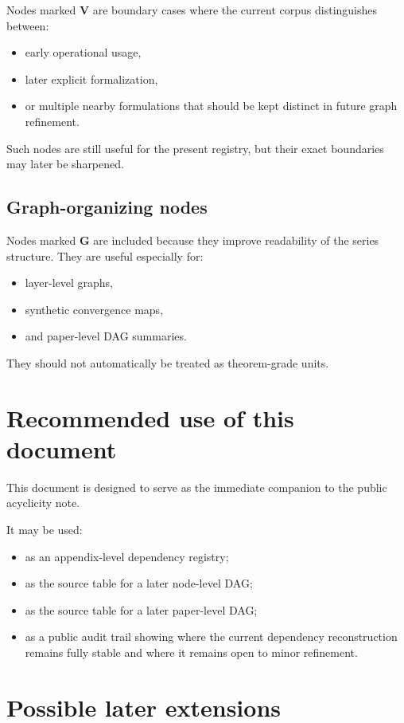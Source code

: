 \documentclass[11pt,a4paper]{article}
\begin{document}
	Nodes marked \textbf{V} are boundary cases where the current corpus distinguishes between:
	\begin{itemize}[leftmargin=2em]
		\item early operational usage,
		\item later explicit formalization,
		\item or multiple nearby formulations that should be kept distinct in future graph refinement.
	\end{itemize}
	
	Such nodes are still useful for the present registry, but their exact boundaries may later be
	sharpened.
	
	\subsection{Graph-organizing nodes}
	
	Nodes marked \textbf{G} are included because they improve readability of the series structure.
	They are useful especially for:
	\begin{itemize}[leftmargin=2em]
		\item layer-level graphs,
		\item synthetic convergence maps,
		\item and paper-level DAG summaries.
	\end{itemize}
	
	They should not automatically be treated as theorem-grade units.
	
	\section{Recommended use of this document}
	
	This document is designed to serve as the immediate companion to the public acyclicity note.
	
	It may be used:
	\begin{itemize}[leftmargin=2em]
		\item as an appendix-level dependency registry;
		\item as the source table for a later node-level DAG;
		\item as the source table for a later paper-level DAG;
		\item as a public audit trail showing where the current dependency reconstruction remains fully stable and where it remains open to minor refinement.
	\end{itemize}
	
	\section{Possible later extensions}
	
	

	
\end{document}
